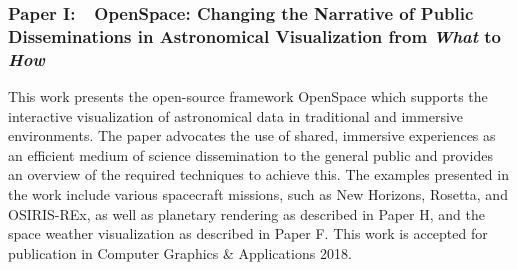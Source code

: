 \subsubsection{Paper I:~~OpenSpace: Changing the Narrative of Public Disseminations in Astronomical Visualization from \emph{What} to \emph{How}}
\vspace*{\absubsubsectionlength}
This work presents the open-source framework OpenSpace which supports the interactive visualization of astronomical data in traditional and immersive environments.  The paper advocates the use of shared, immersive experiences as an efficient medium of science dissemination to the general public and provides an overview of the required techniques to achieve this.  The examples presented in the work include various spacecraft missions, such as New Horizons, Rosetta, and OSIRIS-REx, as well as planetary rendering as described in Paper H, and the space weather visualization as described in Paper F.  This work is accepted for publication in Computer Graphics \& Applications 2018.
